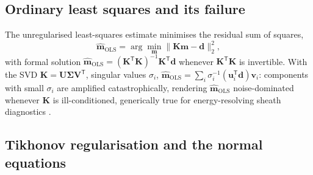 \subsection{Ordinary least squares and its failure}

The unregularised least-squares estimate minimises the residual sum of squares,
\begin{equation}
\hat{\mathbf{m}}_{\mathrm{OLS}} = \arg\min_{\mathbf{m}} \|\mathbf{K}\mathbf{m} - \mathbf{d}\|_{2}^{2},
\end{equation}
with formal solution $\hat{\mathbf{m}}_{\mathrm{OLS}} = (\mathbf{K}^{\mathsf{T}}\mathbf{K})^{-1}\mathbf{K}^{\mathsf{T}}\mathbf{d}$ whenever $\mathbf{K}^{\mathsf{T}}\mathbf{K}$ is invertible. With the SVD $\mathbf{K} = \mathbf{U}\boldsymbol{\Sigma}\mathbf{V}^{\mathsf{T}}$, singular values $\sigma_{i}$, $\hat{\mathbf{m}}_{\mathrm{OLS}} = \sum_{i} \sigma_{i}^{-1}(\mathbf{u}_{i}^{\mathsf{T}}\mathbf{d})\mathbf{v}_{i}$: components with small $\sigma_{i}$ are amplified catastrophically, rendering $\hat{\mathbf{m}}_{\mathrm{OLS}}$ noise-dominated whenever $\mathbf{K}$ is ill-conditioned, generically true for energy-resolving sheath diagnostics \cite{ref0695}.

\subsection{Tikhonov regularisation and the normal equations}

